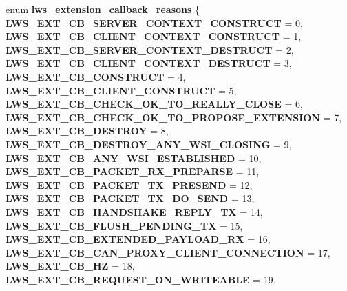 \begin{DoxyCompactItemize}
enum {\bfseries lws\+\_\+extension\+\_\+callback\+\_\+reasons} \{ \newline
{\bfseries L\+W\+S\+\_\+\+E\+X\+T\+\_\+\+C\+B\+\_\+\+S\+E\+R\+V\+E\+R\+\_\+\+C\+O\+N\+T\+E\+X\+T\+\_\+\+C\+O\+N\+S\+T\+R\+U\+CT} = 0, 
{\bfseries L\+W\+S\+\_\+\+E\+X\+T\+\_\+\+C\+B\+\_\+\+C\+L\+I\+E\+N\+T\+\_\+\+C\+O\+N\+T\+E\+X\+T\+\_\+\+C\+O\+N\+S\+T\+R\+U\+CT} = 1, 
{\bfseries L\+W\+S\+\_\+\+E\+X\+T\+\_\+\+C\+B\+\_\+\+S\+E\+R\+V\+E\+R\+\_\+\+C\+O\+N\+T\+E\+X\+T\+\_\+\+D\+E\+S\+T\+R\+U\+CT} = 2, 
{\bfseries L\+W\+S\+\_\+\+E\+X\+T\+\_\+\+C\+B\+\_\+\+C\+L\+I\+E\+N\+T\+\_\+\+C\+O\+N\+T\+E\+X\+T\+\_\+\+D\+E\+S\+T\+R\+U\+CT} = 3, 
\newline
{\bfseries L\+W\+S\+\_\+\+E\+X\+T\+\_\+\+C\+B\+\_\+\+C\+O\+N\+S\+T\+R\+U\+CT} = 4, 
{\bfseries L\+W\+S\+\_\+\+E\+X\+T\+\_\+\+C\+B\+\_\+\+C\+L\+I\+E\+N\+T\+\_\+\+C\+O\+N\+S\+T\+R\+U\+CT} = 5, 
{\bfseries L\+W\+S\+\_\+\+E\+X\+T\+\_\+\+C\+B\+\_\+\+C\+H\+E\+C\+K\+\_\+\+O\+K\+\_\+\+T\+O\+\_\+\+R\+E\+A\+L\+L\+Y\+\_\+\+C\+L\+O\+SE} = 6, 
{\bfseries L\+W\+S\+\_\+\+E\+X\+T\+\_\+\+C\+B\+\_\+\+C\+H\+E\+C\+K\+\_\+\+O\+K\+\_\+\+T\+O\+\_\+\+P\+R\+O\+P\+O\+S\+E\+\_\+\+E\+X\+T\+E\+N\+S\+I\+ON} = 7, 
\newline
{\bfseries L\+W\+S\+\_\+\+E\+X\+T\+\_\+\+C\+B\+\_\+\+D\+E\+S\+T\+R\+OY} = 8, 
{\bfseries L\+W\+S\+\_\+\+E\+X\+T\+\_\+\+C\+B\+\_\+\+D\+E\+S\+T\+R\+O\+Y\+\_\+\+A\+N\+Y\+\_\+\+W\+S\+I\+\_\+\+C\+L\+O\+S\+I\+NG} = 9, 
{\bfseries L\+W\+S\+\_\+\+E\+X\+T\+\_\+\+C\+B\+\_\+\+A\+N\+Y\+\_\+\+W\+S\+I\+\_\+\+E\+S\+T\+A\+B\+L\+I\+S\+H\+ED} = 10, 
{\bfseries L\+W\+S\+\_\+\+E\+X\+T\+\_\+\+C\+B\+\_\+\+P\+A\+C\+K\+E\+T\+\_\+\+R\+X\+\_\+\+P\+R\+E\+P\+A\+R\+SE} = 11, 
\newline
{\bfseries L\+W\+S\+\_\+\+E\+X\+T\+\_\+\+C\+B\+\_\+\+P\+A\+C\+K\+E\+T\+\_\+\+T\+X\+\_\+\+P\+R\+E\+S\+E\+ND} = 12, 
{\bfseries L\+W\+S\+\_\+\+E\+X\+T\+\_\+\+C\+B\+\_\+\+P\+A\+C\+K\+E\+T\+\_\+\+T\+X\+\_\+\+D\+O\+\_\+\+S\+E\+ND} = 13, 
{\bfseries L\+W\+S\+\_\+\+E\+X\+T\+\_\+\+C\+B\+\_\+\+H\+A\+N\+D\+S\+H\+A\+K\+E\+\_\+\+R\+E\+P\+L\+Y\+\_\+\+TX} = 14, 
{\bfseries L\+W\+S\+\_\+\+E\+X\+T\+\_\+\+C\+B\+\_\+\+F\+L\+U\+S\+H\+\_\+\+P\+E\+N\+D\+I\+N\+G\+\_\+\+TX} = 15, 
\newline
{\bfseries L\+W\+S\+\_\+\+E\+X\+T\+\_\+\+C\+B\+\_\+\+E\+X\+T\+E\+N\+D\+E\+D\+\_\+\+P\+A\+Y\+L\+O\+A\+D\+\_\+\+RX} = 16, 
{\bfseries L\+W\+S\+\_\+\+E\+X\+T\+\_\+\+C\+B\+\_\+\+C\+A\+N\+\_\+\+P\+R\+O\+X\+Y\+\_\+\+C\+L\+I\+E\+N\+T\+\_\+\+C\+O\+N\+N\+E\+C\+T\+I\+ON} = 17, 
{\bfseries L\+W\+S\+\_\+\+E\+X\+T\+\_\+\+C\+B\+\_\+HZ} = 18, 
{\bfseries L\+W\+S\+\_\+\+E\+X\+T\+\_\+\+C\+B\+\_\+\+R\+E\+Q\+U\+E\+S\+T\+\_\+\+O\+N\+\_\+\+W\+R\+I\+T\+E\+A\+B\+LE} = 19, 

\end{DoxyCompactItemize}
